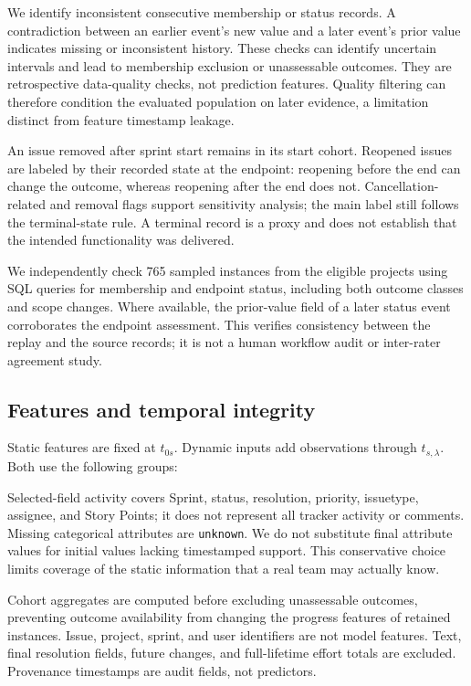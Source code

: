 We identify inconsistent consecutive membership or status records. A contradiction between an earlier event's new value and a later event's prior value indicates missing or inconsistent history. These checks can identify uncertain intervals and lead to membership exclusion or unassessable outcomes. They are retrospective data-quality checks, not prediction features. Quality filtering can therefore condition the evaluated population on later evidence, a limitation distinct from feature timestamp leakage.

An issue removed after sprint start remains in its start cohort. Reopened issues are labeled by their recorded state at the endpoint: reopening before the end can change the outcome, whereas reopening after the end does not. Cancellation-related and removal flags support sensitivity analysis; the main label still follows the terminal-state rule. A terminal record is a proxy and does not establish that the intended functionality was delivered.

We independently check 765 sampled instances from the eligible projects using SQL queries for membership and endpoint status, including both outcome classes and scope changes. Where available, the prior-value field of a later status event corroborates the endpoint assessment. This verifies consistency between the replay and the source records; it is not a human workflow audit or inter-rater agreement study.

\subsection{Features and temporal integrity}\label{features-and-temporal-integrity}

Static features are fixed at \(t_{0s}\). Dynamic inputs add observations through \(t_{s,\lambda}\). Both use the following groups:

{\def\LTcaptype{table}

}

Selected-field activity covers Sprint, status, resolution, priority, issuetype, assignee, and Story Points; it does not represent all tracker activity or comments. Missing categorical attributes are \texttt{unknown}. We do not substitute final attribute values for initial values lacking timestamped support. This conservative choice limits coverage of the static information that a real team may actually know.

Cohort aggregates are computed before excluding unassessable outcomes, preventing outcome availability from changing the progress features of retained instances. Issue, project, sprint, and user identifiers are not model features. Text, final resolution fields, future changes, and full-lifetime effort totals are excluded. Provenance timestamps are audit fields, not predictors.


